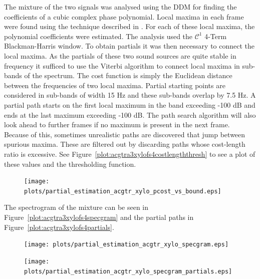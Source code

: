 The mixture of the two signals was analysed using the DDM for finding the
coefficients of a cubic complex phase polynomial. Local maxima in each frame
were found using the technique described in \cite[p.~42]{serra1989system}. For
each of these local maxima, the polynomial coefficients were estimated. The
analysis used the $\mathcal{C}^{1}$ 4-Term Blackman-Harris window. To obtain
partials it was then necessary to connect the local maxima. As the partials of
these two sound sources are quite stable in frequency it sufficed to use the
Viterbi algorithm \cite{forney1973viterbi} to connect local maxima in sub-bands
of the spectrum. The cost function is simply the Euclidean distance between the
frequencies of two local maxima. Partial starting points are considered in
sub-bands of width 15 Hz and these sub-bands overlap by 7.5 Hz. A partial path
starts on the first local maximum in the band exceeding -100 dB and ends at the
last maximum exceeding -100 dB. The path search algorithm will also look ahead
to further frames if no maximum is present in the next frame. Because of this,
sometimes unrealistic paths are discovered that jump between spurious maxima.
These are filtered out by discarding paths whose cost-length ratio is excessive.
See Figure~\ref{plot:acgtra3xylofs4costlengththresh} to see a plot of these
values and the thresholding function. 
\begin{figure}[!t]
    \centering
    \texttt{[image: plots/partial\_estimation\_acgtr\_xylo\_pcost\_vs\_bound.eps]}
\end{figure}
The spectrogram of
the mixture can be seen in Figure~\ref{plot:acgtra3xylofs4specgram} and the
partial paths in Figure~\ref{plot:acgtra3xylofs4partials}.
\begin{figure}[!t]
    \centering
    \texttt{[image: plots/partial\_estimation\_acgtr\_xylo\_specgram.eps]}
    \CaptionWithTitle{%
    }{\label{plot:acgtra3xylofs4specgram}}
\end{figure}
\begin{figure}[!t]
    \centering
    \texttt{[image: plots/partial\_estimation\_acgtr\_xylo\_specgram\_partials.eps]}
    \CaptionWithTitle{%
    }{\label{plot:acgtra3xylofs4partials}}
\end{figure}

